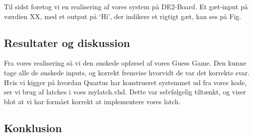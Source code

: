 \documentclass[../journal.tex]{subfiles}
\begin{document}
Til sidst foretog vi en realisering af vores system på DE2-Board. Et gæt-input på værdien XX, med et output på `Hi', der indikere et rigtigt gæt, kan ses på Fig.%



\subsection{Resultater og diskussion}

Fra vores realisering så vi den ønskede opførsel af vores Guess Game. Den kunne tage alle de ønskede inputs, og korrekt fremvise hvorvidt de var det korrekte svar.\newline \newline
Hvis vi kigger på hvordan Quartus har konstrueret systemmet ud fra vores kode, ser vi brug af latches i voes mylatch.vhd. Dette var selvfølgelig tiltænkt, og viser blot at vi har formået korrekt at implementere vores latch.


\subsection{Konklusion}
\end{document}
